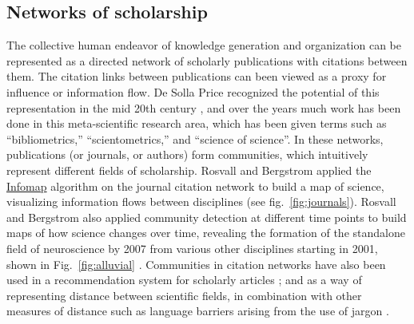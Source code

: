 \hypertarget{networks-of-scholarship}{\subsection{Networks of
scholarship}\label{networks-of-scholarship}}

\protect\hyperlink{networks-of-scholarship}{}

The collective human endeavor of knowledge generation and organization
can be represented as a directed network of scholarly publications with
citations between them. The citation links between publications can been
viewed as a proxy for influence or information flow. De Solla Price
recognized the potential of this representation in the mid 20th century
\autocite{de_solla_price_networks_1965}, and over the years much work
has been done in this meta-scientific research area, which has been
given terms such as ``bibliometrics,'' ``scientometrics,'' and ``science
of science''. In these networks, publications (or journals, or authors)
form communities, which intuitively represent different fields of
scholarship. Rosvall and Bergstrom \autocite{rosvall_maps_2008} applied
the \protect\hyperlink{the-dynamical-perspective}{Infomap} algorithm on
the journal citation network to build a map of science, visualizing
information flows between disciplines (see fig.~\ref{fig:journals}).
Rosvall and Bergstrom also applied community detection at different time
points to build maps of how science changes over time, revealing the
formation of the standalone field of neuroscience by 2007 from various
other disciplines starting in 2001, shown in Fig.~\ref{fig:alluvial}
\autocite{rosvall_mapping_2010}. Communities in citation networks have
also been used in a recommendation system for scholarly articles
\autocite{west_recommendation_2016}; and as a way of representing
distance between scientific fields, in combination with other measures
of distance such as language barriers arising from the use of jargon
\autocite{vilhena_finding_2014}.


